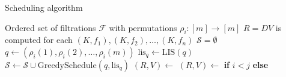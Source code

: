 \documentclass[sn-mathphys]{sn-jnl}
\begin{document}
\begin{algorithm}[h]
	\caption{Scheduling algorithm}\label{alg:schedule}
    \begin{algorithmic}[1]
    	\Require Ordered set of filtrations $\mathcal{F}$ with permutations $\rho_{i}: [m] \to [m]$
    	\Ensure $R = D V$ is computed for each  $(K,f_1),(K,f_2), \dots, (K,f_n)$
    		\State $\mathcal{S} = \emptyset$
    		    \State $q \gets  (\rho_i(1), \rho_i(2), \ldots, \rho_i(m))$ 
    			\State $\mathrm{lis}_q \gets \mathrm{LIS}(q)$ 
    			\State $\mathcal{S} \gets \mathcal{S} \cup \mathrm{GreedySchedule}(q, \mathrm{lis}_q)$ 
    		\EndFor
	    	\State $(R, V) \gets$ 
	    		\State $(R, V) \gets$ \textbf{if} $i < j$  \textbf{else} 
	    	\EndFor
    	\EndProcedure
	\end{algorithmic}
\end{algorithm}

\end{document}
